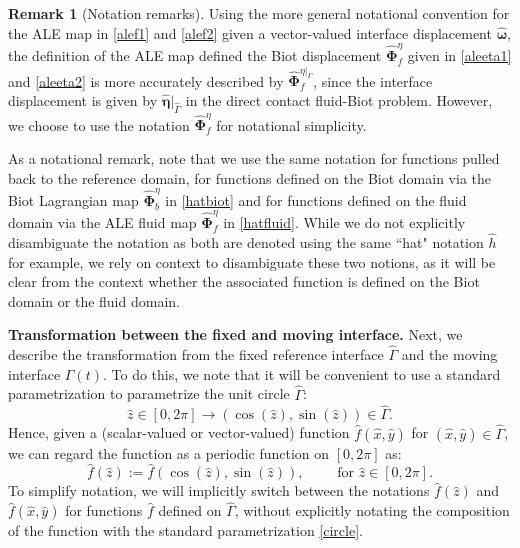 \documentclass[11pt]{article}
\newcommand{\bd}{\boldsymbol}
\theoremstyle{definition}
\newtheorem{remark}{Remark}[section]
\begin{document}
\begin{remark}[Notation remarks]
Using the more general notational convention for the ALE map in \eqref{alef1} and \eqref{alef2} given a vector-valued interface displacement $\hat{\bd{\omega}}$, the definition of the ALE map defined the Biot displacement $\hat{\bd{\Phi}}^{\eta}_{f}$ given in \eqref{aleeta1} and \eqref{aleeta2} is more accurately described by $\hat{\bd{\Phi}}^{\eta|_{\Gamma}}_{f}$, since the interface displacement is given by $\hat{\bd{\eta}}|_{\hat{\Gamma}}$ in the direct contact fluid-Biot problem. However, we choose to use the notation $\hat{\bd{\Phi}}^{\eta}_{f}$ for notational simplicity. 

As a notational remark, note that we use the same notation for functions pulled back to the reference domain, for functions defined on the Biot domain via the Biot Lagrangian map $\hat{\bd{\Phi}}^{\eta}_{b}$ in \eqref{hatbiot} and for functions defined on the fluid domain via the ALE fluid map $\hat{\bd{\Phi}}^{\eta}_{f}$ in \eqref{hatfluid}. While we do not explicitly disambiguate the notation as both are denoted using the same ``hat" notation $\hat{h}$ for example, we rely on context to disambiguate these two notions, as it will be clear from the context whether the associated function is defined on the Biot domain or the fluid domain.
\end{remark}

\medskip

\noindent \textbf{Transformation between the fixed and moving interface.} Next, we describe the transformation from the fixed reference interface $\hat{\Gamma}$ and the moving interface $\Gamma(t)$. To do this, we note that it will be convenient to use a standard parametrization to parametrize the unit circle $\hat{\Gamma}$:
\begin{equation}\label{circle}
\hat{z} \in [0, 2\pi] \to (\cos(\hat{z}), \sin(\hat{z})) \in \hat{\Gamma}.
\end{equation}
Hence, given a (scalar-valued or vector-valued) function $\hat{f}(\hat{x}, \hat{y})$ for $(\hat{x}, \hat{y}) \in \hat{\Gamma}$, we can regard the function as a periodic function on $[0, 2\pi]$ as:
\begin{equation*}
\hat{f}(\hat{z}) := \hat{f}(\cos(\hat{z}), \sin(\hat{z})), \qquad \text{ for } \hat{z} \in [0, 2\pi].
\end{equation*}
To simplify notation, we will implicitly switch between the notations $\hat{f}(\hat{z})$ and $\hat{f}(\hat{x}, \hat{y})$ for functions $\hat{f}$ defined on $\hat{\Gamma}$, without explicitly notating the composition of the function with the standard parametrization \eqref{circle}.  
\end{document}
